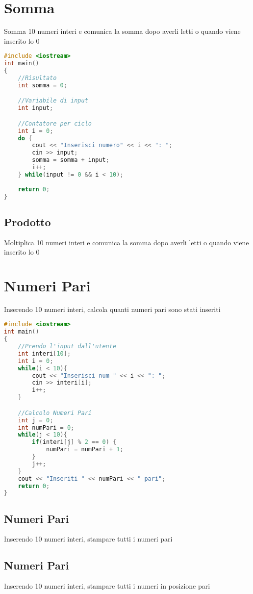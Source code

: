 \documentclass{article}
\begin{document}
\maketitle
\tableofcontents
\newpage
\vspace*{\fill}

\section{Somma} Somma 10 numeri interi e comunica la somma dopo averli letti o quando viene inserito lo 0
\begin{lstlisting}[language=C++]
#include <iostream>
int main()
{
    //Risultato
    int somma = 0;

    //Variabile di input
    int input;

    //Contatore per ciclo
    int i = 0; 
    do {
        cout << "Inserisci numero" << i << ": "; 
        cin >> input;
        somma = somma + input;
        i++;
    } while(input != 0 && i < 10);
    
    return 0;
}
\end{lstlisting}
\subsection{Prodotto} Moltiplica 10 numeri interi e comunica la somma dopo averli letti o quando viene inserito lo 0
\pagebreak
\section{Numeri Pari} Inserendo 10 numeri interi, calcola quanti numeri pari sono stati inseriti
\begin{lstlisting}[language=C++]
#include <iostream>
int main()
{
    //Prendo l'input dall'utente
    int interi[10];
    int i = 0;
    while(i < 10){
        cout << "Inserisci num " << i << ": ";
        cin >> interi[i];
        i++;
    }

    //Calcolo Numeri Pari
    int j = 0;
    int numPari = 0;
    while(j < 10){
        if(interi[j] % 2 == 0) {
            numPari = numPari + 1;
        }
        j++;
    }
    cout << "Inseriti " << numPari << " pari";
    return 0;
}
\end{lstlisting}
\subsection{Numeri Pari} Inserendo 10 numeri interi, stampare tutti i numeri pari
\subsection{Numeri Pari} Inserendo 10 numeri interi, stampare tutti i numeri in posizione pari
\pagebreak
\end{document}
